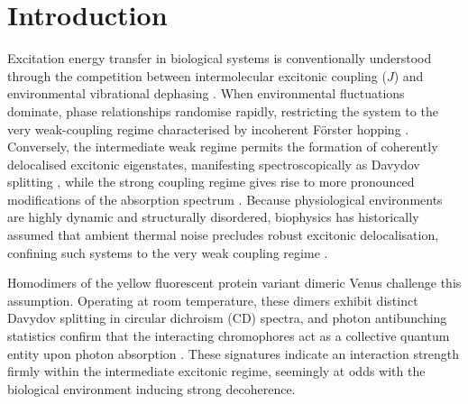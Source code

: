 \documentclass[journal=jpclcd, manuscript=letter, layout=twocolumn, doi=true]{achemso}
\begin{document}
\section{Introduction}
Excitation energy transfer in biological systems is conventionally understood through the competition between intermolecular excitonic coupling ($J$) and environmental vibrational dephasing \cite{forster1965delocalized, may2004charge}. When environmental fluctuations dominate, phase relationships randomise rapidly, restricting the system to the very weak-coupling regime characterised by incoherent Förster hopping \cite{forster1948intermolecular}. Conversely, the intermediate weak regime permits the formation of coherently delocalised excitonic eigenstates, manifesting spectroscopically as Davydov splitting \cite{davydov1971}, while the strong coupling regime gives rise to more pronounced modifications of the absorption spectrum \cite{clegg2006history}. Because physiological environments are highly dynamic and structurally disordered, biophysics has historically assumed that ambient thermal noise precludes robust excitonic delocalisation, confining such systems to the very weak coupling regime \cite{clegg2006history, nelson2018role}.

Homodimers of the yellow fluorescent protein variant dimeric Venus challenge this assumption. Operating at room temperature, these dimers exhibit distinct Davydov splitting in circular dichroism (CD) spectra, and photon antibunching statistics confirm that the interacting chromophores act as a collective quantum entity upon photon absorption \cite{kim2019venusa206, freed2025effect}. These signatures indicate an interaction strength firmly within the intermediate excitonic regime, seemingly at odds with the biological environment inducing strong decoherence.
\end{document}
